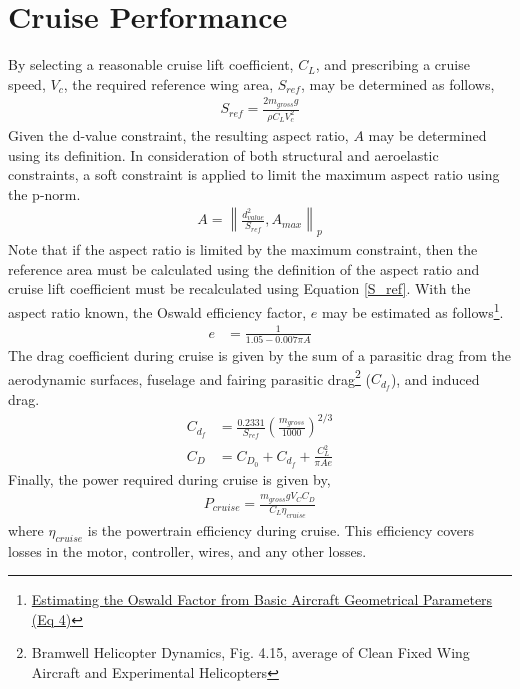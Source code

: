 \documentclass[12pt, letter]{article}
\begin{document}
\section{Cruise Performance}
By selecting a reasonable cruise lift coefficient, $C_L$, and prescribing a cruise speed, $V_c$, the required reference wing area, $S_{ref}$, may be determined as follows,
\begin{align}
	S_{ref}=\frac{2m_{gross}g}{\rho C_L V_c^2} \label{S_ref}
\end{align}
Given the d-value constraint, the resulting aspect ratio, $A$ may be determined using its definition. In consideration of both structural and aeroelastic constraints, a soft constraint is applied to limit the maximum aspect ratio using the p-norm.
\begin{align}
	A=\left\|\frac{d_{value}^2}{S_{ref}},A_{max}\right\|_p
\end{align}
Note that if the aspect ratio is limited by the maximum constraint, then the reference area must be calculated using the definition of the aspect ratio and cruise lift coefficient must be recalculated using Equation \ref{S_ref}. With the aspect ratio known, the Oswald efficiency factor, $e$ may be estimated as follows\footnote{\href{https://bit.ly/2BhwcbZ}{Estimating the Oswald Factor from Basic Aircraft Geometrical Parameters (Eq 4)}}.
\begin{align}
	e &=\frac{1}{1.05-0.007 \pi A}
\end{align}
The drag coefficient during cruise is given by the sum of a parasitic drag from the aerodynamic surfaces, fuselage and fairing parasitic drag\footnote{Bramwell Helicopter Dynamics, Fig. 4.15, average of Clean Fixed Wing Aircraft and Experimental Helicopters} ($C_{d_f}$), and induced drag.
\begin{align}
	C_{d_f}&=\frac{0.2331}{S_{ref}} \left(\frac{m_{gross}}{1000}\right)^{2/3}\\
	C_D&=C_{D_0}+C_{d_f}+\frac{C_L^2}{\pi A e}
\end{align}
Finally, the power required during cruise is given by,
\begin{align}
	P_{cruise} = \frac{m_{gross} g V_C C_D}{C_L \eta_{cruise}}
\end{align}
where $\eta_{cruise}$ is the powertrain efficiency during cruise. This efficiency covers losses in the motor, controller, wires, and any other losses.
\end{document}
